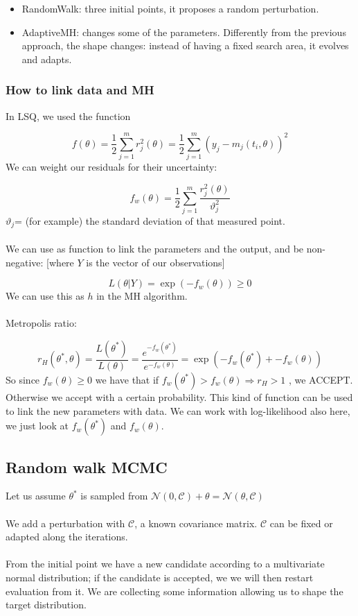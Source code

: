 \begin{itemize}
\tightlist
\item
  RandomWalk: three initial points, it proposes a random perturbation.
\item
  AdaptiveMH: changes some of the parameters. Differently from the
  previous approach, the shape changes: instead of having a fixed search
  area, it evolves and adapts.
\end{itemize}


\subsubsection{How to link data and MH}

In LSQ, we used the function

$$
f(\theta)=\frac{1}{2}\sum^m_{j=1}r^2_j(\theta)=\frac{1}{2}\sum^m_{j=1}(y_j-m_j(t_i,\theta))^2
$$
\noindent
We can weight our residuals for their uncertainty:

$$
f_w(\theta)=\frac{1}{2}\sum^m_{j=1} \frac{r^2_j(\theta)}{\vartheta_j^2}
$$
\noindent
$\vartheta_j$= (for example) the standard deviation of that measured
point.
\\
\\
\noindent
We can use as function to link the parameters and the output, and be
non-negative: {[}where $Y$ is the vector of our observations{]}

$$
L(\theta|Y)=\exp(-f_w(\theta)) \geq 0
$$
\noindent
We can use this as $h$ in the MH algorithm.
\\
\\
\noindent
Metropolis ratio:

$$
r_H(\theta^*,\theta)=\frac{L(\theta^*)}{L(\theta)}=\frac{e^{-f_w(\theta^*)}}{e^{-f_w(\theta)}}=\exp(-f_w(\theta^*)+-f_w(\theta))
$$
\noindent
So since $f_w(\theta)\geq0$ we have that if
$f_w(\theta^*) > f_w(\theta) \Rightarrow r_H>1$ , we ACCEPT. Otherwise
we accept with a certain probability. This kind of function can be used
to link the new parameters with data.
\noindent
We can work with log-likelihood also here, we just look at
$f_w(\theta^*)$ and $f_w(\theta)$.


\subsection{Random walk MCMC}

Let us assume $\theta^*$ is sampled from
$\mathcal{N}(0,\mathcal{C})+\theta=\mathcal{N}(\theta,\mathcal{C})$
\\
\\
\noindent
We add a perturbation with $\mathcal{C}$, a known covariance matrix.
$\mathcal{C}$ can be fixed or adapted along the iterations.
\\
\\
\noindent
From the initial point we have a new candidate according to a
multivariate normal distribution; if the candidate is accepted, we we
will then restart evaluation from it. We are collecting some information
allowing us to shape the target distribution.


